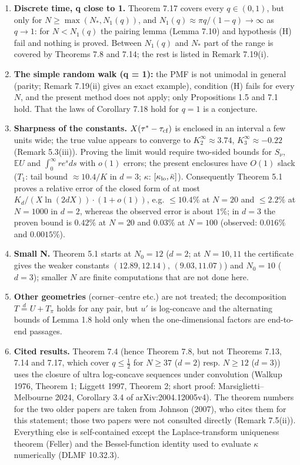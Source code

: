 \documentclass[11pt,a4paper]{article}
\theoremstyle{definition}
\theoremstyle{remark}
\begin{document}
\begin{enumerate}
\item \textbf{Discrete time, q close to 1.} Theorem 7.17 covers every $q\in(0,1)$, but only for $N\ge\max(N_*,N_1(q))$, and $N_1(q)\approx\pi q/(1-q)\to\infty$ as $q\to1$: for $N<N_1(q)$ the pairing lemma (Lemma 7.10) and hypothesis (H) fail and nothing is proved. Between $N_1(q)$ and $N_*$ part of the range is covered by Theorems 7.8 and 7.14; the rest is listed in Remark 7.19(i).
\item \textbf{The simple random walk (q = 1):} the PMF is not unimodal in general (parity; Remark 7.19(ii) gives an exact example), condition (H) fails for every $N$, and the present method does not apply; only Propositions 1.5 and 7.1 hold. That the laws of Corollary 7.18 hold for $q=1$ is a conjecture.
\item \textbf{Sharpness of the constants.} $X(\tau^*-\tau_{\rm cf})$ is enclosed in an interval a few units wide; the true value appears to converge to $K_2^\infty\approx3.74$, $K_3^\infty\approx-0.22$ (Remark 5.3(iii)). Proving the limit would require two-sided bounds for $S_\nu$, $\mathbb EU$ and $\int_0^\infty re^{s}ds$ with $o(1)$ errors; the present enclosures have $O(1)$ slack ($T_1$: tail bound $\approx10.4/K$ in $d=3$; $\kappa$: $[\kappa_{\rm lo},\bar\kappa]$). Consequently Theorem 5.1 proves a relative error of the closed form of at most $K_d/(X\ln(2dX))\cdot(1+o(1))$, e.g. $\le10.4\%$ at $N=20$ and $\le2.2\%$ at $N=1000$ in $d=2$, whereas the observed error is about $1\%$; in $d=3$ the proven bound is $0.42\%$ at $N=20$ and $0.03\%$ at $N=100$ (observed: $0.016\%$ and $0.0015\%$).
\item \textbf{Small N.} Theorem 5.1 starts at $N_0=12$ ($d=2$; at $N=10,11$ the certificate gives the weaker constants $(12.89,12.14)$, $(9.03,11.07)$) and $N_0=10$ ($d=3$); smaller $N$ are finite computations that are not done here.
\item \textbf{Other geometries} (corner–centre etc.) are not treated; the decomposition $T\overset d=U+T_\pi$ holds for any pair, but $u'$ is log-concave and the alternating bounds of Lemma 1.8 hold only when the one-dimensional factors are end-to-end passages.
\item \textbf{Cited results.} Theorem 7.4 (hence Theorem 7.8, but not Theorems 7.13, 7.14 and 7.17, which cover $q\le\frac12$ for $N\ge37$ ($d=2$) resp. $N\ge12$ ($d=3$)) uses the closure of ultra log-concave sequences under convolution (Walkup 1976, Theorem 1; Liggett 1997, Theorem 2; short proof: Marsiglietti–Melbourne 2024, Corollary 3.4 of arXiv:2004.12005v4). The theorem numbers for the two older papers are taken from Johnson (2007), who cites them for this statement; those two papers were not consulted directly (Remark 7.5(ii)). Everything else is self-contained except the Laplace-transform uniqueness theorem (Feller) and the Bessel-function identity used to evaluate $\kappa$ numerically (DLMF 10.32.3).

\end{enumerate}
\end{document}

